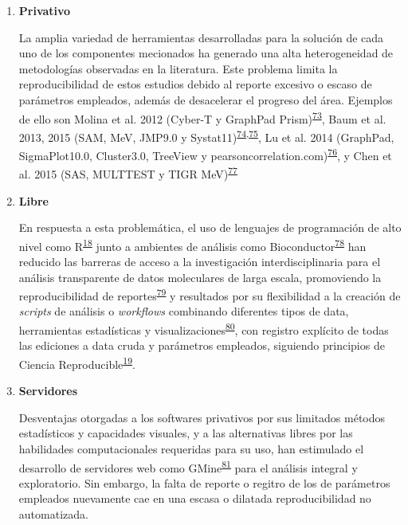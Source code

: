 \documentclass[]{article}
\begin{document}
\begin{enumerate}
\begin{enumerate}
    \begin{enumerate}
    \def\labelenumiii{\arabic{enumiii}.}
    \item
      \textbf{Privativo}

      La amplia variedad de herramientas desarrolladas para la solución
      de cada uno de los componentes mecionados ha generado una alta
      heterogeneidad de metodologías observadas en la literatura. Este
      problema limita la reproducibilidad de estos estudios debido al
      reporte excesivo o escaso de parámetros empleados, además de
      desacelerar el progreso del área. Ejemplos de ello son Molina et
      al. 2012 (Cyber-T y GraphPad
      Prism)\textsuperscript{\protect\hyperlink{ref-molina2012}{73}},
      Baum et al. 2013, 2015 (SAM, MeV, JMP9.0 y
      Systat11)\textsuperscript{\protect\hyperlink{ref-baum2013}{74},\protect\hyperlink{ref-baum2015}{75}},
      Lu et al. 2014 (GraphPad, SigmaPlot10.0, Cluster3.0, TreeView y
      pearsoncorrelation.com)\textsuperscript{\protect\hyperlink{ref-lu2014rama}{76}},
      y Chen et al. 2015 (SAS, MULTTEST y TIGR
      MeV)\textsuperscript{\protect\hyperlink{ref-chen2015immunomics}{77}}
    \item
      \textbf{Libre}

      En respuesta a esta problemática, el uso de lenguajes de
      programación de alto nivel como
      R\textsuperscript{\protect\hyperlink{ref-R}{18}} junto a ambientes
      de análisis como
      Bioconductor\textsuperscript{\protect\hyperlink{ref-bioconductor2004}{78}}
      han reducido las barreras de acceso a la investigación
      interdisciplinaria para el análisis transparente de datos
      moleculares de larga escala, promoviendo la reproducibilidad de
      reportes\textsuperscript{\protect\hyperlink{ref-knitr}{79}} y
      resultados por su flexibilidad a la creación de \emph{scripts} de
      análisis o \emph{workflows} combinando diferentes tipos de data,
      herramientas estadísticas y
      visualizaciones\textsuperscript{\protect\hyperlink{ref-Biobase}{80}},
      con registro explícito de todas las ediciones a data cruda y
      parámetros empleados, siguiendo principios de Ciencia
      Reproducible\textsuperscript{\protect\hyperlink{ref-CienciaReproducible2016}{19}}.
      \newpage
    \item
      \textbf{Servidores}

      Desventajas otorgadas a los softwares privativos por sus limitados
      métodos estadísticos y capacidades visuales, y a las alternativas
      libres por las habilidades computacionales requeridas para su uso,
      han estimulado el desarrollo de servidores web como
      GMine\textsuperscript{\protect\hyperlink{ref-gmine2016}{81}} para
      el análisis integral y exploratorio. Sin embargo, la falta de
      reporte o regitro de los de parámetros empleados nuevamente cae en
      una escasa o dilatada reproducibilidad no automatizada.
    \end{enumerate}
  \end{enumerate}
\end{enumerate}
\end{document}
